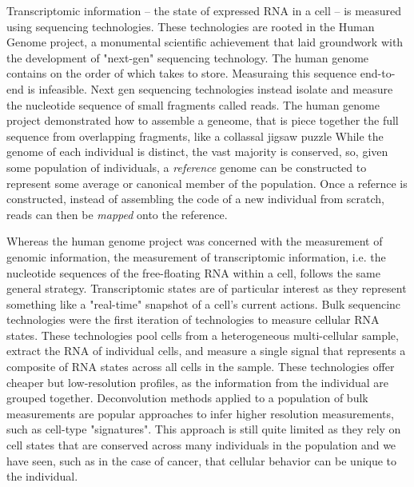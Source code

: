 Transcriptomic information -- the state of expressed RNA in a cell -- is measured using sequencing technologies.
These technologies are rooted in the Human Genome project,
a monumental scientific achievement that laid groundwork with the development of "next-gen" sequencing technology. %
The human genome contains on the order of %
which takes %
to store.
Measuraing this sequence end-to-end is infeasible.
Next gen sequencing technologies instead isolate and measure the nucleotide sequence of small fragments called reads.
The human genome project demonstrated how to assemble a geneome, that is piece together the full sequence from overlapping fragments, like a collassal jigsaw puzzle \cite{verify,need}
While the genome of each individual is distinct, the vast majority is conserved,
so, given some population of individuals, a \emph{reference} genome can be constructed to represent some average or canonical member of the population.
Once a refernce is constructed, instead of assembling the code of a new individual from scratch, reads can then be \emph{mapped} onto the reference.

Whereas the human genome project was concerned with the measurement of genomic information,
the measurement of transcriptomic information, i.e. the nucleotide sequences of the free-floating RNA within a cell, follows the same general strategy.
Transcriptomic states are of particular interest as they represent something like a "real-time" snapshot of a cell's current actions.
Bulk sequencinc technologies were the first iteration of technologies to measure cellular RNA states.
These technologies pool cells from a heterogeneous multi-cellular sample,
extract the RNA of individual cells, and measure a single signal that represents a composite of RNA states across all cells in the sample.
These technologies offer cheaper but low-resolution profiles, as the information from the individual are grouped together.
Deconvolution methods applied to a population of bulk measurements are popular approaches to infer higher resolution measurements, such as cell-type "signatures".
This approach is still quite limited as they rely on cell states that are conserved across many individuals in the population and we have seen,
such as in the case of cancer, that cellular behavior can be unique to the individual.

